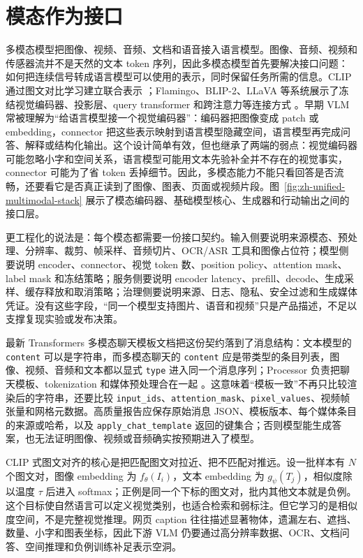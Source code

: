 \documentclass[UTF8,zihao=-4,openany]{ctexbook}
\begin{document}
\section{模态作为接口}
多模态模型把图像、视频、音频、文档和语音接入语言模型。图像、音频、视频和传感器流并不是天然的文本 token 序列，因此多模态模型首先要解决接口问题：如何把连续信号转成语言模型可以使用的表示，同时保留任务所需的信息。CLIP 通过图文对比学习建立联合表示 \cite{radford2021learning}；Flamingo、BLIP-2、LLaVA 等系统展示了冻结视觉编码器、投影层、query transformer 和跨注意力等连接方式 \cite{alayrac2022flamingo,li2023blip2,liu2023visual}。早期 VLM 常被理解为“给语言模型接一个视觉编码器”：编码器把图像变成 patch 或 embedding，connector 把这些表示映射到语言模型隐藏空间，语言模型再完成问答、解释或结构化输出。这个设计简单有效，但也继承了两端的弱点：视觉编码器可能忽略小字和空间关系，语言模型可能用文本先验补全并不存在的视觉事实，connector 可能为了省 token 丢掉细节。因此，多模态能力不能只看回答是否流畅，还要看它是否真正读到了图像、图表、页面或视频片段。图~\ref{fig:zh-unified-multimodal-stack} 展示了模态编码器、基础模型核心、生成器和行动输出之间的接口层。

更工程化的说法是：每个模态都需要一份接口契约。输入侧要说明来源模态、预处理、分辨率、裁剪、帧采样、音频切片、OCR/ASR 工具和图像占位符；模型侧要说明 encoder、connector、视觉 token 数、position policy、attention mask、label mask 和冻结策略；服务侧要说明 encoder latency、prefill、decode、生成采样、缓存释放和取消策略；治理侧要说明来源、日志、隐私、安全过滤和生成媒体凭证。没有这些字段，“同一个模型支持图片、语音和视频”只是产品描述，不足以支撑复现实验或发布决策。

最新 Transformers 多模态聊天模板文档把这份契约落到了消息结构：文本模型的 \texttt{content} 可以是字符串，而多模态聊天的 \texttt{content} 应是带类型的条目列表，图像、视频、音频和文本都以显式 \texttt{type} 进入同一个消息序列；Processor 负责把聊天模板、tokenization 和媒体预处理合在一起 \cite{huggingface2026transformersmultimodalchat}。这意味着“模板一致”不再只比较渲染后的字符串，还要比较 \texttt{input\_ids}、\texttt{attention\_mask}、\texttt{pixel\_values}、视频帧张量和网格元数据。高质量报告应保存原始消息 JSON、模板版本、每个媒体条目的来源或哈希，以及 \texttt{apply\_chat\_template} 返回的键集合；否则模型能生成答案，也无法证明图像、视频或音频确实按预期进入了模型。

CLIP 式图文对齐的核心是把匹配图文对拉近、把不匹配对推远。设一批样本有 $N$ 个图文对，图像 embedding 为 $f_\theta(I_i)$，文本 embedding 为 $g_\psi(T_j)$，相似度除以温度 $\tau$ 后进入 softmax；正例是同一个下标的图文对，批内其他文本就是负例。这个目标使自然语言可以定义视觉类别，也适合检索和弱标注。但它学习的是相似度空间，不是完整视觉推理。网页 caption 往往描述显著物体，遗漏左右、遮挡、数量、小字和图表坐标，因此下游 VLM 仍要通过高分辨率数据、OCR、文档问答、空间推理和负例训练补足表示空洞。
\end{document}
